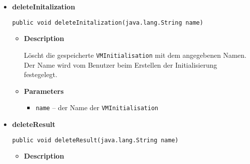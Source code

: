 {{{{{{\begin{itemize}
{\begin{itemize}
{Löscht das gespeicherte \texttt{\small VMGame} mit dem angegebenen Namen. Der Name wird vom Benutzer beim Erstellen des Stufenspiels festegelegt.
}
\item{
{\bf  Parameters}
  \begin{itemize}
   \item{
\texttt{name} -- der Name des \texttt{\small VMGame}}
  \end{itemize}
}%
\end{itemize}
}%
\item{ 
\hypertarget{de.sswis.controller.FileManager.deleteInitalization(java.lang.String)}{{\bf  deleteInitalization}\\}
\begin{lstlisting}[frame=none]
public void deleteInitalization(java.lang.String name)\end{lstlisting} %
\begin{itemize}
\item{
{\bf  Description}

Löscht die gespeicherte \texttt{\small VMInitialisation} mit dem angegebenen Namen. Der Name wird vom Benutzer beim Erstellen der Initialisierung festegelegt.
}
\item{
{\bf  Parameters}
  \begin{itemize}
   \item{
\texttt{name} -- der Name der \texttt{\small VMInitialisation}}
  \end{itemize}
}%
\end{itemize}
}%
\item{ 
\hypertarget{de.sswis.controller.FileManager.deleteResult(java.lang.String)}{{\bf  deleteResult}\\}
\begin{lstlisting}[frame=none]
public void deleteResult(java.lang.String name)\end{lstlisting} %
\begin{itemize}
\item{
{\bf  Description}

}
\end{itemize}}
\end{itemize}}}}}}}
